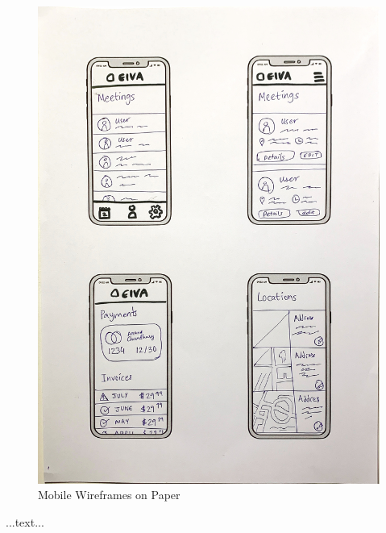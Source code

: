 \documentclass{article}
\begin{document}
\begin{figure}
\begin{minipage}{.5\textwidth}
		\includegraphics[width=1\linewidth]{drawing-phone-4.jpg}
	\end{minipage}
	\caption{Mobile Wireframes on Paper}
\end{figure}

...text...
\end{document}

